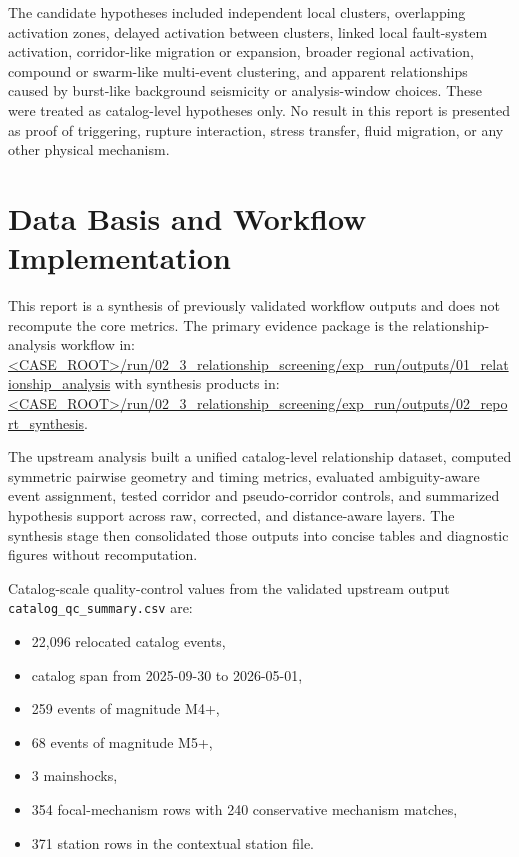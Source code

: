 \documentclass[11pt]{article}
\begin{document}
The candidate hypotheses included independent local clusters, overlapping activation zones, delayed activation between clusters, linked local fault-system activation, corridor-like migration or expansion, broader regional activation, compound or swarm-like multi-event clustering, and apparent relationships caused by burst-like background seismicity or analysis-window choices. These were treated as catalog-level hypotheses only. No result in this report is presented as proof of triggering, rupture interaction, stress transfer, fluid migration, or any other physical mechanism.

\section{Data Basis and Workflow Implementation}
This report is a synthesis of previously validated workflow outputs and does not recompute the core metrics. The primary evidence package is the relationship-analysis workflow in:
\url{<CASE_ROOT>/run/02_3_relationship_screening/exp_run/outputs/01_relationship_analysis}
with synthesis products in:
\url{<CASE_ROOT>/run/02_3_relationship_screening/exp_run/outputs/02_report_synthesis}.

The upstream analysis built a unified catalog-level relationship dataset, computed symmetric pairwise geometry and timing metrics, evaluated ambiguity-aware event assignment, tested corridor and pseudo-corridor controls, and summarized hypothesis support across raw, corrected, and distance-aware layers. The synthesis stage then consolidated those outputs into concise tables and diagnostic figures without recomputation.

Catalog-scale quality-control values from the validated upstream output \texttt{catalog\_qc\_summary.csv} are:
\begin{itemize}
    \item 22{,}096 relocated catalog events,
    \item catalog span from 2025-09-30 to 2026-05-01,
    \item 259 events of magnitude M4+,
    \item 68 events of magnitude M5+,
    \item 3 mainshocks,
    \item 354 focal-mechanism rows with 240 conservative mechanism matches,
    \item 371 station rows in the contextual station file.
\end{itemize}
\end{document}
